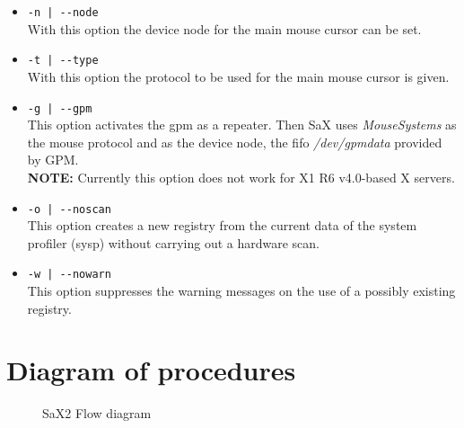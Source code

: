 \begin{itemize}
\item \verb+-n | --node+\\  
      With this option the device node for the main mouse cursor can be set.

\item \verb+-t | --type+\\
      With this  option the protocol to be used for the main mouse cursor
      is given. 

\item \verb+-g | --gpm+\\
      This option activates the gpm as a repeater. Then SaX uses 
      \textit{MouseSystems} as the mouse protocol and as the device node, the
      fifo \textit{/dev/gpmdata} provided by GPM.\\
      \textbf{NOTE:} Currently this option does not work for X1 R6 v4.0-based
      X servers.

\item \verb+-o | --noscan+\\
      This option creates a new registry from the current data of the system 
      profiler (sysp) without carrying out a hardware scan.

\item \verb+-w | --nowarn+\\
      This option suppresses the warning messages on the use of a possibly
      existing registry.
\end{itemize}


\newpage 
\section{Diagram of procedures}

\begin{figure}[h]
\centering
{}
\caption{SaX2 Flow diagram}
\end{figure}







